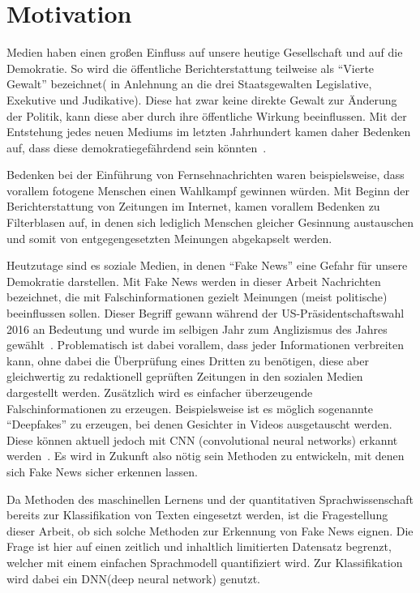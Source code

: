 \chapter{Motivation}
Medien haben einen großen Einfluss auf unsere heutige Gesellschaft und auf die Demokratie.
So wird die öffentliche Berichterstattung teilweise als \enquote{Vierte Gewalt} bezeichnet( 
in Anlehnung an die drei Staatsgewalten Legislative, Exekutive und Judikative). Diese hat 
zwar keine direkte Gewalt zur Änderung der Politik, kann diese aber durch ihre öffentliche 
Wirkung beeinflussen. Mit der Entstehung jedes neuen Mediums im letzten Jahrhundert kamen daher 
Bedenken auf, dass diese demokratiegefährdend sein könnten~\cite{hunt_fake}.
 
Bedenken bei der Einführung von Fernsehnachrichten waren beispielsweise, dass vorallem fotogene Menschen
einen Wahlkampf gewinnen würden. Mit Beginn der Berichterstattung von Zeitungen im Internet,
kamen vorallem Bedenken zu Filterblasen auf, in denen sich lediglich Menschen gleicher 
Gesinnung austauschen und somit von entgegengesetzten Meinungen abgekapselt werden.

Heutzutage sind es soziale Medien, in denen \enquote{Fake News} eine Gefahr für unsere Demokratie 
darstellen. Mit Fake News werden in dieser Arbeit Nachrichten bezeichnet, die mit Falschinformationen
gezielt Meinungen (meist politische) beeinflussen sollen. Dieser Begriff gewann während der 
US-Präsidentschaftswahl 2016 an Bedeutung und wurde im selbigen Jahr zum Anglizismus des Jahres gewählt~\cite{nzz}.
Problematisch ist dabei vorallem, dass jeder Informationen verbreiten 
kann, ohne dabei die Überprüfung eines Dritten zu benötigen, diese aber gleichwertig
zu redaktionell geprüften Zeitungen in den sozialen Medien dargestellt werden. Zusätzlich 
wird es einfacher überzeugende Falschinformationen zu erzeugen. Beispielsweise ist es möglich
sogenannte \enquote{Deepfakes} zu erzeugen, bei denen Gesichter in Videos ausgetauscht werden.
Diese können aktuell jedoch mit CNN (convolutional neural networks) erkannt werden~\cite{deepfake}.
Es wird in Zukunft also nötig sein Methoden zu entwickeln, mit denen sich Fake News sicher erkennen lassen.

Da Methoden des maschinellen Lernens und der quantitativen Sprachwissenschaft bereits zur Klassifikation
von Texten eingesetzt werden, ist die Fragestellung dieser Arbeit, ob sich solche Methoden zur Erkennung 
von Fake News eignen. Die Frage ist hier auf einen zeitlich und inhaltlich 
limitierten Datensatz begrenzt, welcher mit einem einfachen Sprachmodell quantifiziert wird.
Zur Klassifikation wird dabei ein DNN(deep neural network) genutzt.